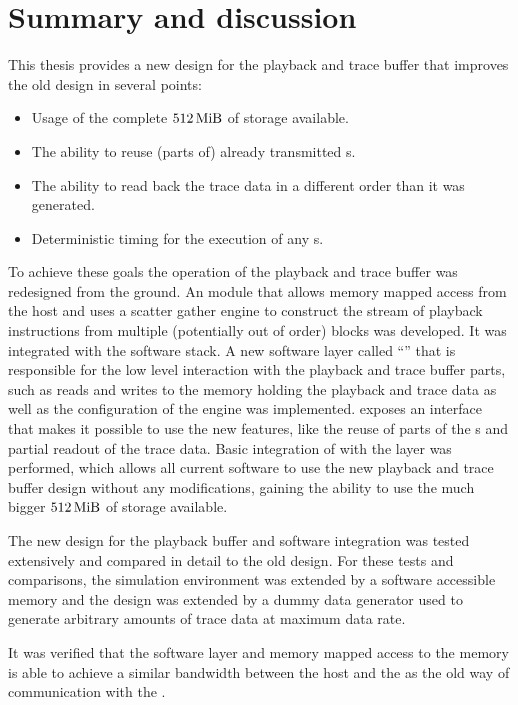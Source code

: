 \section{Summary and discussion}
This thesis provides a new design for the playback and trace buffer that improves the old design in several points:
\begin{itemize}
\item Usage of the complete $\DDRSIZE{}$ of storage available.
\item The ability to reuse (parts of) already transmitted \PlaybackProgram{}s.
\item The ability to read back the trace data in a different order than it was generated.
\item Deterministic timing for the execution of any \PlaybackProgram{}s.
\end{itemize}
To achieve these goals the operation of the playback and trace buffer was redesigned from the ground. An \FPGA{} module that allows memory mapped access from the host and uses a scatter gather \DMA{} engine to construct the stream of playback instructions from multiple (potentially out of order) blocks was developed. It was integrated with the \BSSTwo{} software stack. A new software layer called ``\ayo{}'' that is responsible for the low level interaction with the playback and trace buffer parts, such as reads and writes to the \DDR{} memory holding the playback and trace data as well as the configuration of the \DMA{} engine was implemented. \ayo{} exposes an interface that makes it possible to use the new features, like the reuse of parts of the \PlaybackProgram{}s and partial readout of the trace data. Basic integration of \ayo{} with the \hxcomm{} layer was performed, which allows all current software to use the new playback and trace buffer design without any modifications, gaining the ability to use the much bigger $\DDRSIZE{}$ of storage available.

The new design for the playback buffer and software integration was tested extensively and compared in detail to the old design. For these tests and comparisons, the simulation environment was extended by a software accessible \AXI{} memory and the \FPGA{} design was extended by a dummy data generator used to generate arbitrary amounts of trace data at maximum data rate.

It was verified that the software layer and memory mapped access to the \DDR{} memory is able to achieve a similar bandwidth between the host and the \FPGA{} as the old way of communication with the \FPGA{}.

